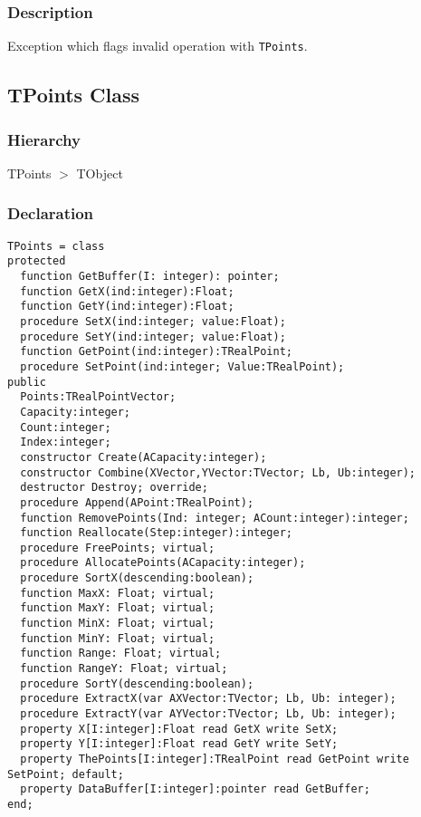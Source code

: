 \documentclass[12pt,a4paper,oneside]{report}
\newcommand{\code}[1]{\texttt{#1}}
\begin{document}
\subsubsection{Description}
Exception which flags invalid operation with \code{TPoints}.
 
\subsection{TPoints Class}
\label{lmPointsVec.TPoints}
\subsubsection{Hierarchy}
TPoints {$>$} TObject
\subsubsection{Declaration}
\begin{verbatim}
TPoints = class
protected
  function GetBuffer(I: integer): pointer;
  function GetX(ind:integer):Float;
  function GetY(ind:integer):Float;
  procedure SetX(ind:integer; value:Float);
  procedure SetY(ind:integer; value:Float);
  function GetPoint(ind:integer):TRealPoint;
  procedure SetPoint(ind:integer; Value:TRealPoint);
public
  Points:TRealPointVector;
  Capacity:integer;
  Count:integer;
  Index:integer;
  constructor Create(ACapacity:integer);
  constructor Combine(XVector,YVector:TVector; Lb, Ub:integer);
  destructor Destroy; override;
  procedure Append(APoint:TRealPoint);
  function RemovePoints(Ind: integer; ACount:integer):integer;
  function Reallocate(Step:integer):integer;
  procedure FreePoints; virtual;
  procedure AllocatePoints(ACapacity:integer);
  procedure SortX(descending:boolean);
  function MaxX: Float; virtual;
  function MaxY: Float; virtual;
  function MinX: Float; virtual;
  function MinY: Float; virtual;
  function Range: Float; virtual;
  function RangeY: Float; virtual;
  procedure SortY(descending:boolean);
  procedure ExtractX(var AXVector:TVector; Lb, Ub: integer);
  procedure ExtractY(var AYVector:TVector; Lb, Ub: integer);
  property X[I:integer]:Float read GetX write SetX;
  property Y[I:integer]:Float read GetY write SetY;
  property ThePoints[I:integer]:TRealPoint read GetPoint write SetPoint; default;
  property DataBuffer[I:integer]:pointer read GetBuffer;
end;
\end{verbatim}
\end{document}

